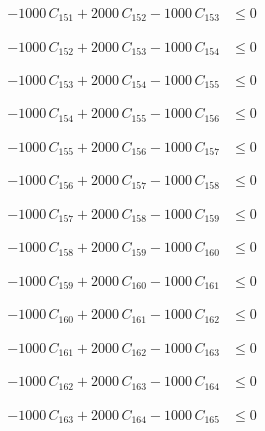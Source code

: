 \documentclass[a4paper,11pt]{article}
\begin{document}
\begin{align}
-1000\,C_{151} + 2000\,C_{152} - 1000\,C_{153} &\leq 0 \nonumber
\end{align}

\begin{align}
-1000\,C_{152} + 2000\,C_{153} - 1000\,C_{154} &\leq 0 \nonumber
\end{align}

\begin{align}
-1000\,C_{153} + 2000\,C_{154} - 1000\,C_{155} &\leq 0 \nonumber
\end{align}

\begin{align}
-1000\,C_{154} + 2000\,C_{155} - 1000\,C_{156} &\leq 0 \nonumber
\end{align}

\begin{align}
-1000\,C_{155} + 2000\,C_{156} - 1000\,C_{157} &\leq 0 \nonumber
\end{align}

\begin{align}
-1000\,C_{156} + 2000\,C_{157} - 1000\,C_{158} &\leq 0 \nonumber
\end{align}

\begin{align}
-1000\,C_{157} + 2000\,C_{158} - 1000\,C_{159} &\leq 0 \nonumber
\end{align}

\begin{align}
-1000\,C_{158} + 2000\,C_{159} - 1000\,C_{160} &\leq 0 \nonumber
\end{align}

\begin{align}
-1000\,C_{159} + 2000\,C_{160} - 1000\,C_{161} &\leq 0 \nonumber
\end{align}

\begin{align}
-1000\,C_{160} + 2000\,C_{161} - 1000\,C_{162} &\leq 0 \nonumber
\end{align}

\begin{align}
-1000\,C_{161} + 2000\,C_{162} - 1000\,C_{163} &\leq 0 \nonumber
\end{align}

\begin{align}
-1000\,C_{162} + 2000\,C_{163} - 1000\,C_{164} &\leq 0 \nonumber
\end{align}

\begin{align}
-1000\,C_{163} + 2000\,C_{164} - 1000\,C_{165} &\leq 0 \nonumber
\end{align}
\end{document}
